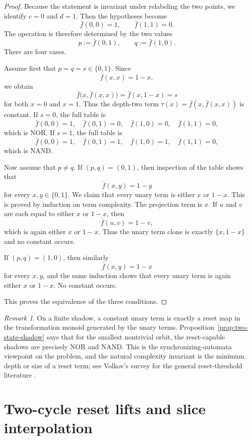 \documentclass[11pt]{amsart}
\numberwithin{equation}{section}
\theoremstyle{remark}
\newtheorem{remark}[theorem]{Remark}
\theoremstyle{definition}
\begin{document}
\begin{proof}
Because the statement is invariant under relabeling the two points, we identify $c=0$ and $d=1$. Then the hypotheses become
\[
\bar f(0,0)=1,\qquad \bar f(1,1)=0.
\]
The operation is therefore determined by the two values
\[
p:=\bar f(0,1),\qquad q:=\bar f(1,0).
\]
There are four cases.

Assume first that $p=q=s\in\{0,1\}$. Since
\[
\bar f(x,x)=1-x,
\]
we obtain
\[
\bar f\bigl(x,\bar f(x,x)\bigr)=\bar f(x,1-x)=s
\]
for both $x=0$ and $x=1$. Thus the depth-two term $\tau(x)=\bar f(x,\bar f(x,x))$ is constant. If $s=0$, the full table is
\[
\bar f(0,0)=1,\quad \bar f(0,1)=0,\quad \bar f(1,0)=0,\quad \bar f(1,1)=0,
\]
which is NOR. If $s=1$, the full table is
\[
\bar f(0,0)=1,\quad \bar f(0,1)=1,\quad \bar f(1,0)=1,\quad \bar f(1,1)=0,
\]
which is NAND.

Now assume that $p\neq q$. If $(p,q)=(0,1)$, then inspection of the table shows that
\[
\bar f(x,y)=1-y
\]
for every $x,y\in\{0,1\}$. We claim that every unary term is either $x$ or $1-x$. This is proved by induction on term complexity. The projection term is $x$. If $u$ and $v$ are each equal to either $x$ or $1-x$, then
\[
\bar f(u,v)=1-v,
\]
which is again either $x$ or $1-x$. Thus the unary term clone is exactly $\{x,1-x\}$ and no constant occurs.

If $(p,q)=(1,0)$, then similarly
\[
\bar f(x,y)=1-x
\]
for every $x,y$, and the same induction shows that every unary term is again either $x$ or $1-x$. No constant occurs.

This proves the equivalence of the three conditions.
\end{proof}

\begin{remark}
On a finite shadow, a constant unary term is exactly a reset map in the transformation monoid generated by the unary terms. Proposition~\ref{prop:two-state-shadow} says that for the smallest nontrivial orbit, the reset-capable shadows are precisely NOR and NAND. This is the synchronizing-automata viewpoint on the problem, and the natural complexity invariant is the minimum depth or size of a reset term; see Volkov's survey for the general reset-threshold literature \cite{Volkov2008}.
\end{remark}

\section{Two-cycle reset lifts and slice interpolation}\label{sec:two-cycle}
\end{document}
